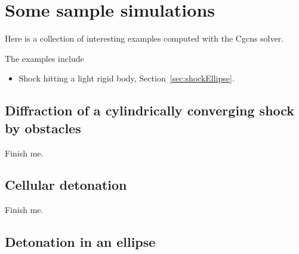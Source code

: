  \newcommand{\Gc}{{\mathcal G}}

\section{Some sample simulations} \label{sec:sampleSimulations}

Here is a collection of interesting examples computed with the Cgcns solver.

The examples include
\begin{itemize}
   \item Shock hitting a light rigid body, Section~\ref{sec:shockEllipse}.
\end{itemize}



\subsection{Diffraction of a cylindrically converging shock by obstacles}\label{sec:cylindricalShock}

  Finish me.


\subsection{Cellular detonation}\label{sec:cellularDetonation}

  Finish me.


\subsection{Detonation in an ellipse}\label{sec:detonationEllipse}

